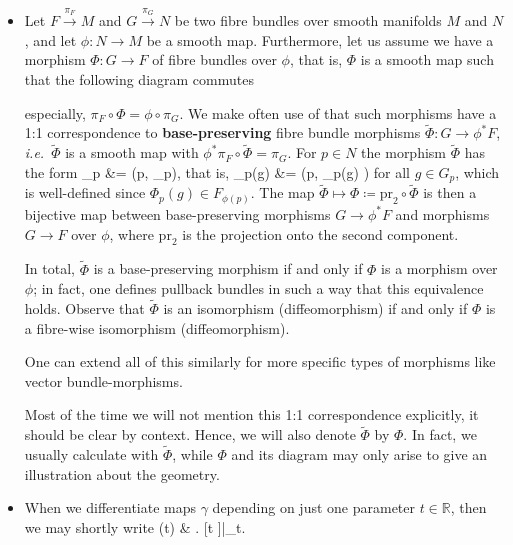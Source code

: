 \documentclass[a4paper,oneside,11pt,bibliography=totoc]{scrartcl}
\def\ba#1\ea{\begin{align}#1\end{align}}
\def\bas#1\eas{\begin{align*}#1\end{align*}}
\theoremstyle{plain}
\theoremstyle{remark}
\theoremstyle{definition}
\begin{document}
\begin{itemize}
	\item Let $F \stackrel{\pi_F}{\to} M$ and $G \stackrel{\pi_G}{\to} N$ be two fibre bundles over smooth manifolds $M$ and $N$, and let $\phi: N \to M$ be a smooth map. Furthermore, let us assume we have a morphism $\Phi: G \to F$ of fibre bundles over $\phi$, that is, $\Phi$ is a smooth map such that the following diagram commutes
	\begin{center}
	\end{center}
especially, $\pi_F \circ \Phi = \phi \circ \pi_G$.
We make often use of that such morphisms have a 1:1 correspondence to \textbf{base-preserving} fibre bundle morphisms $\widetilde{\Phi}: G \to \phi^*F$, \textit{i.e.}\ $\widetilde{\Phi}$ is a smooth map with $\phi^*\pi_F \circ \widetilde{\Phi} = \pi_G$. For $p \in N$ the morphism $\widetilde{\Phi}$ has the form
\bas
\widetilde{\Phi}_p
&=
(p, \Phi_p),
\eas
that is,
\bas
\widetilde{\Phi}_p(g)
&=
\bigl(p, \Phi_p(g) \bigr)
\eas
for all $g \in G_p$, which is well-defined since $\Phi_p(g) \in F_{\phi(p)}$. The map $\widetilde{\Phi} \mapsto \Phi \coloneqq \mathrm{pr}_2 \circ \widetilde{\Phi}$ is then a bijective map between base-preserving morphisms $G \to \phi^*F$ and morphisms $G \to F$ over $\phi$, where $\mathrm{pr}_2$ is the projection onto the second component. 

In total, $\widetilde{\Phi}$ is a base-preserving morphism if and only if $\Phi$ is a morphism over $\phi$; in fact, one defines pullback bundles in such a way that this equivalence holds. Observe that $\widetilde{\Phi}$ is an isomorphism (diffeomorphism) if and only if $\Phi$ is a fibre-wise isomorphism (diffeomorphism).

One can extend all of this similarly for more specific types of morphisms like vector bundle-morphisms.

Most of the time we will not mention this 1:1 correspondence explicitly, it should be clear by context. Hence, we will also denote $\widetilde{\Phi}$ by $\Phi$. In fact, we usually calculate with $\widetilde{\Phi}$, while $\Phi$ and its diagram may only arise to give an illustration about the geometry.

\item When we differentiate maps $\gamma$ depending on just one parameter $t \in \mathbb{R}$, then we may shortly write
\bas
\frac{\mathrm{d}}{\mathrm{d}t} \gamma(t)
&\coloneqq
\mleft. [t \mapsto \gamma]\mright|_t.
\eas
\end{itemize}
\end{document}
